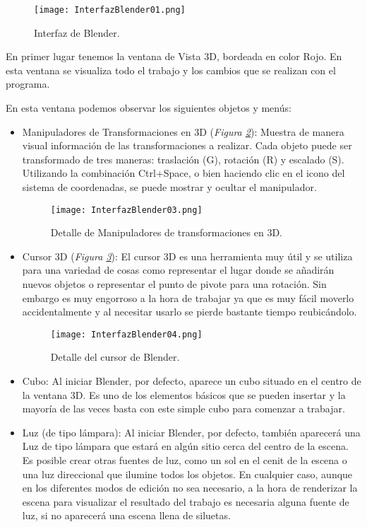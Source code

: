 \begin{figure}[ht]
	\centering
	\texttt{[image: InterfazBlender01.png]}
	\caption{Interfaz de Blender.} \label{fig:interfazblender01}
\end{figure}


En primer lugar tenemos la ventana de Vista 3D, bordeada en color Rojo. En esta ventana se visualiza todo el trabajo y los cambios que se realizan con el programa.

En esta ventana podemos observar los siguientes objetos y menús:

\begin{itemize}
	\item Manipuladores de Transformaciones en 3D (\textit{Figura \ref{fig:interfazblender03}}): Muestra de manera visual información de las transformaciones a realizar. Cada objeto puede ser transformado de tres maneras: traslación (G), rotación (R) y escalado (S). Utilizando la combinación Ctrl+Space,	o bien haciendo clic en el icono del sistema de coordenadas, se puede mostrar y ocultar el manipulador. 
	\begin{figure}[h]
		\centering
		\texttt{[image: InterfazBlender03.png]}
		\caption{Detalle de Manipuladores de transformaciones en 3D.} \label{fig:interfazblender03}
	\end{figure}
	
	
	\item Cursor 3D (\textit{Figura \ref{fig:interfazblender04}}): El cursor 3D es una herramienta muy útil y se utiliza para una variedad de cosas como representar el lugar donde se añadirán nuevos objetos o representar el punto de pivote para una rotación. Sin embargo es muy engorroso a la hora de trabajar ya que es muy fácil moverlo accidentalmente y al necesitar usarlo se pierde bastante tiempo reubicándolo.
	\begin{figure}[h]
		\centering
		\texttt{[image: InterfazBlender04.png]}
		\caption{Detalle del cursor de Blender.} \label{fig:interfazblender04}
	\end{figure}

	\item Cubo: Al iniciar Blender, por defecto, aparece un cubo situado en el centro de la ventana 3D. Es uno de los elementos básicos que se pueden insertar y la mayoría de las veces basta con este simple cubo para comenzar a trabajar.
	
	\item Luz (de tipo lámpara): Al iniciar Blender, por defecto, también aparecerá una Luz de tipo lámpara que estará en algún sitio cerca del centro de la escena. Es posible crear otras fuentes de luz, como un sol en el cenit de la escena o una luz direccional que ilumine todos los objetos. En cualquier caso, aunque en los diferentes modos de edición no sea necesario, a la hora de renderizar la escena para visualizar el resultado del trabajo es necesaria alguna fuente de luz, si no aparecerá una escena llena de siluetas.
	

\end{itemize}
